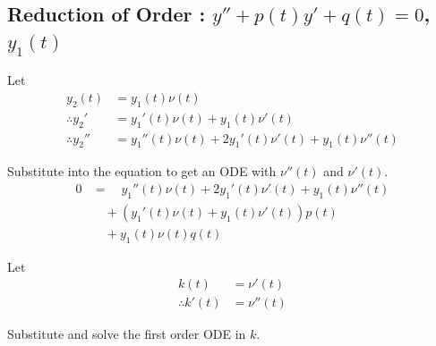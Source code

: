 \documentclass[fleqn, a4paper, 8pt, twoside]{amsart}
\theoremstyle{definition}
\theoremstyle{theorem}
\begin{document}
\begin{multicols}{2}
\begin{spacing}{0.85}
\subsection{Reduction of Order : $y'' + p(t) y' + q(t) = 0$, $y_1(t)$}

\begin{algorithmic}[1]
	\item
		Let
		\begin{align*}
			y_2(t) &= y_1(t) \nu(t)\\
			\therefore {y_2}' &= {y_1}'(t) \nu(t) + y_1(t) \nu'(t)\\
			\therefore {y_2}'' &= {y_1}''(t) \nu(t) + 2 {y_1}'(t) \nu'(t) + y_1(t) \nu''(t)
		\end{align*}
	\item
		Substitute into the equation to get an ODE with $\nu''(t)$ and $\nu'(t)$.
		\begin{align*}
			0 &= \quad {y_1}''(t) \nu(t) + 2 {y_1}'(t) \nu'(t) + y_1(t) \nu''(t)\\
			&\quad + \left( {y_1}'(t) \nu(t) + y_1(t) \nu'(t) \right) p(t)\\
			&\quad + y_1(t) \nu(t) q(t)
		\end{align*}
	\item
		Let
		\begin{align*}
			k(t) &= \nu'(t)\\
			\therefore k'(t) &= \nu''(t)
		\end{align*}
	\item
       	Substitute and solve the first order ODE in $k$.
\end{algorithmic}

\end{spacing}

\end{multicols}
\end{document}
